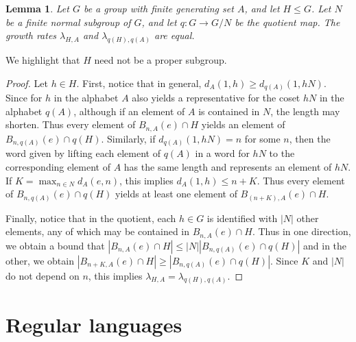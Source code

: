 \documentclass[10pt,a4paper]{amsart}
\newtheorem{lemma}[theorem]{Lemma}
\begin{document}
\begin{lemma}\label{lem:quotient-by-finite-normal}
    Let $G$ be a group with finite generating set $A$, and let $H \leq G$. Let $N$ be a finite normal subgroup of $G$, and let $q : G \rightarrow G/N$ be the quotient map. The growth rates $\lambda_{H,A}$ and $\lambda_{q(H), q(A)}$ are equal.
\end{lemma}
We highlight that $H$ need not be a proper subgroup.
\begin{proof}
    Let $h \in H$. First, notice that in general, $d_{A}(1,h) \geq d_{q(A)}(1, h N)$. Since for $h$ in the alphabet $A$ also yields a representative for the coset $hN$ in the alphabet $q(A)$, although if an element of $A$ is contained in $N$, the length may shorten. Thus every element of $B_{n,A}(e) \cap H$ yields an element of $B_{n, q(A)}(e) \cap q(H)$. Similarly, if $d_{q(A)}(1, hN) = n$ for some $n$, then the word given by lifting each element of $q(A)$ in a word for $hN$ to the corresponding element of $A$ has the same length and represents an element of $hN$. If $K = \max_{n \in N} d_A (e,n)$, this implies $d_A (1, h) \leq n +K$. Thus every element of $B_{n , q(A)}(e) \cap q(H)$ yields at least one element of $B_{(n+K), A}(e) \cap H$.
    
    Finally, notice that in the quotient, each $h \in G$ is identified with $|N|$ other elements, any of which may be contained in $B_{n,A}(e) \cap H$. Thus in one direction, we obtain a bound that $|B_{n,A}(e) \cap H| \leq |N||B_{n, q(A)}(e) \cap q(H)|$ and in the other, we obtain $|B_{n+K , A} (e) \cap H | \geq |B_{n , q(A)} (e) \cap q(H)|$. Since $K$ and $|N|$ do not depend on $n$, this implies $\lambda_{H,A} = \lambda_{q(H), q(A)}$. 
\end{proof}


\section{Regular languages}
\end{document}
